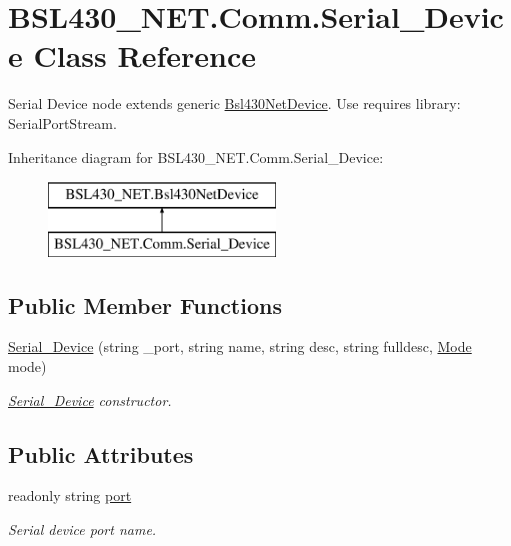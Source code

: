\hypertarget{class_b_s_l430___n_e_t_1_1_comm_1_1_serial___device}{}\section{B\+S\+L430\+\_\+\+N\+E\+T.\+Comm.\+Serial\+\_\+\+Device Class Reference}
\label{class_b_s_l430___n_e_t_1_1_comm_1_1_serial___device}


Serial Device node extends generic \mbox{\hyperlink{class_b_s_l430___n_e_t_1_1_bsl430_net_device}{Bsl430\+Net\+Device}}. Use requires library\+: Serial\+Port\+Stream.  


Inheritance diagram for B\+S\+L430\+\_\+\+N\+E\+T.\+Comm.\+Serial\+\_\+\+Device\+:\begin{figure}[H]
\begin{center}
\leavevmode
\includegraphics[height=2.000000cm]{class_b_s_l430___n_e_t_1_1_comm_1_1_serial___device}
\end{center}
\end{figure}
\subsection*{Public Member Functions}
\begin{DoxyCompactItemize}
\item 
\mbox{\hyperlink{class_b_s_l430___n_e_t_1_1_comm_1_1_serial___device_a85a4a2cc35a431d0b5b5e51d4c964365}{Serial\+\_\+\+Device}} (string \+\_\+port, string name, string desc, string fulldesc, \mbox{\hyperlink{namespace_b_s_l430___n_e_t_aa1c6981cb6f279b5491d861ca555a1d7}{Mode}} mode)
\begin{DoxyCompactList}\small\item\em \mbox{\hyperlink{class_b_s_l430___n_e_t_1_1_comm_1_1_serial___device}{Serial\+\_\+\+Device}} constructor. \end{DoxyCompactList}\end{DoxyCompactItemize}
\subsection*{Public Attributes}
\begin{DoxyCompactItemize}
\item 
readonly string \mbox{\hyperlink{class_b_s_l430___n_e_t_1_1_comm_1_1_serial___device_ae689000702f17c930096f23930424b64}{port}}
\begin{DoxyCompactList}\small\item\em Serial device port name. \end{DoxyCompactList}\end{DoxyCompactItemize}



